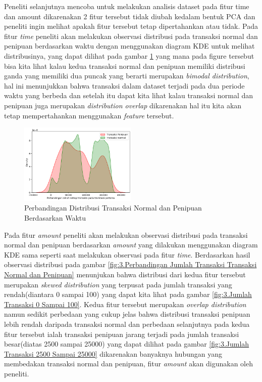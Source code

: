 Peneliti selanjutnya mencoba untuk melakukan analisis dataset pada fitur time dan amount dikarenakan 2 fitur tersebut tidak diubah kedalam bentuk PCA dan peneliti ingin melihat apakah fitur tersebut tetap dipertahankan atau tidak. Pada fitur \textit{time} peneliti akan melakukan observasi distribusi pada transaksi normal dan penipuan berdasarkan waktu dengan menggunakan diagram KDE untuk melihat distribusinya, yang dapat dilihat pada gambar \ref{fig:3.Perbandingan Distribusi Transaksi Normal dan Penipuan Berdasarkan Waktu} yang mana pada figure tersebut bisa kita lihat kalau kedua transaksi normal dan penipuan memiliki distribusi ganda yang memiliki dua puncak yang berarti merupakan \textit{bimodal distribution}\cite{gonick1993cartoon}, hal ini menunjukkan bahwa transaksi dalam dataset terjadi pada dua periode waktu yang berbeda dan setelah itu dapat kita lihat kalau transaksi normal dan penipuan juga merupakan \textit{distribution overlap}\cite{gonick1993cartoon} dikarenakan hal itu kita akan tetap mempertahankan menggunakan \textit{feature} tersebut. 
\begin{figure}[H]
	\centering
	\includegraphics[width=0.5\textwidth]{figure/distribusiwaktunormalpenipuan.png}
	\caption{Perbandingan Distribusi Transaksi Normal dan Penipuan Berdasarkan Waktu}
	\label{fig:3.Perbandingan Distribusi Transaksi Normal dan Penipuan Berdasarkan Waktu}
\end{figure}
Pada fitur \textit{amount} peneliti akan melakukan observasi distribusi pada transaksi normal dan penipuan berdasarkan \textit{amount} yang dilakukan menggunakan diagram KDE sama seperti saat melakukan observasi pada fitur \textit{time}. Berdasarkan hasil observasi distribusi pada gambar \ref{fig:3.Perbandingan Jumlah Transaksi Transaksi Normal dan Penipuan} menunjukan bahwa distribusi dari kedua fitur tersebut merupakan \textit{skewed distribution} yang terpusat pada jumlah transaksi yang rendah(diantara 0 sampai 100) yang dapat kita lihat pada gambar \ref{fig:3.Jumlah Transaksi 0 Sampai 100}. Kedua fitur tersebut merupakan \textit{overlap distribution} namun sedikit perbedaan yang cukup jelas bahwa distribusi transaksi penipuan lebih rendah daripada transaksi normal dan perbedaan selanjutnya pada kedua fitur tersebut ialah transaksi penipuan jarang terjadi pada jumlah transaksi besar(diatas 2500 sampai 25000) yang dapat dilihat pada gambar \ref{fig:3.Jumlah Transaksi 2500 Sampai 25000} dikarenakan banyaknya hubungan yang membedakan transaksi normal dan penipuan, fitur \textit{amount} akan digunakan oleh peneliti.
